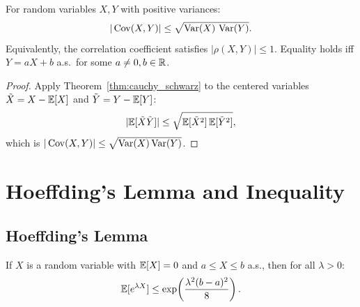 \documentclass[11pt,a4paper]{article}
\begin{document}
\begin{corollary}
\label{cor:cov_bound}
For random variables $X, Y$ with positive variances:
\begin{equation}
  |\operatorname{Cov}(X, Y)| \leq \sqrt{\operatorname{Var}(X)\, \operatorname{Var}(Y)}.
  \label{eq:cov_bound}
\end{equation}
Equivalently, the correlation coefficient satisfies
$|\rho(X,Y)| \leq 1$.  Equality holds iff $Y = aX + b$ a.s.\
for some $a \neq 0, b \in \mathbb{R}$.
\end{corollary}

\begin{proof}
Apply Theorem~\ref{thm:cauchy_schwarz} to the centered variables
$\tilde{X} = X - \mathbb{E}[X]$ and $\tilde{Y} = Y - \mathbb{E}[Y]$:
\begin{equation}
  |\mathbb{E}[\tilde{X}\tilde{Y}]|
  \leq \sqrt{\mathbb{E}[\tilde{X}^2]\, \mathbb{E}[\tilde{Y}^2]},
\end{equation}
which is $|\operatorname{Cov}(X,Y)| \leq \sqrt{\operatorname{Var}(X)\operatorname{Var}(Y)}$.
\end{proof}


\section{Hoeffding's Lemma and Inequality}
\label{sec:hoeffding}

\subsection{Hoeffding's Lemma}
\label{subsec:hoeffding_lemma}

\begin{lemma}
\label{lem:hoeffding}
If $X$ is a random variable with $\mathbb{E}[X] = 0$ and
$a \leq X \leq b$ a.s., then for all $\lambda > 0$:
\begin{equation}
  \mathbb{E}[e^{\lambda X}]
  \leq \exp\!\left(\frac{\lambda^2 (b - a)^2}{8}\right).
  \label{eq:hoeffding_lemma}
\end{equation}
\end{lemma}
\end{document}
